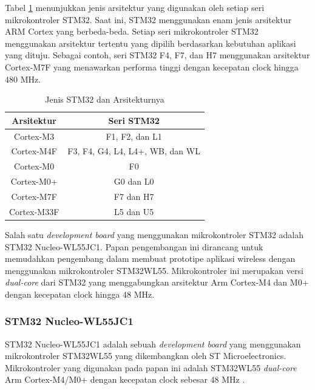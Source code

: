 Tabel \ref{Tab: stm-arch-table} menunjukkan jenis arsitektur yang digunakan oleh setiap seri mikrokontroler STM32. Saat ini, STM32 menggunakan enam jenis arsitektur ARM Cortex yang berbeda-beda. Setiap seri mikrokontroler STM32 menggunakan arsitektur tertentu yang dipilih berdasarkan kebutuhan aplikasi yang dituju. Sebagai contoh, seri STM32 F4, F7, dan H7 menggunakan arsitektur Cortex-M7F yang menawarkan performa tinggi dengan kecepatan clock hingga 480 MHz.

\begin{table}[H]
	\caption{Jenis STM32 dan Arsitekturnya}
	\vspace{0.5em}
	\centering
	\begin{tabular}{cc}
		\hline
		\textbf{Arsitektur} & \textbf{Seri STM32} \\
		\hline 
		Cortex-M3 & F1, F2, dan L1\\
		Cortex-M4F & F3, F4, G4, L4, L4+, WB, dan WL\\
		Cortex-M0 & F0\\ 
		Cortex-M0+ & G0 dan L0\\
		Cortex-M7F & F7 dan H7\\ 
		Cortex-M33F & L5 dan U5\\ \hline
	\end{tabular}
	\label{Tab: stm-arch-table}
\end{table}

Salah satu \textit{development board} yang menggunakan mikrokontroler STM32 adalah STM32 Nucleo-WL55JC1. Papan pengembangan ini dirancang untuk memudahkan pengembang dalam membuat prototipe aplikasi wireless dengan menggunakan mikrokontroler STM32WL55. Mikrokontroler ini merupakan versi \textit{dual-core} dari STM32 yang menggabungkan arsitektur Arm Cortex-M4 dan M0+ dengan kecepatan clock hingga 48 MHz.

\subsubsection{STM32 Nucleo-WL55JC1}
STM32 Nucleo-WL55JC1 adalah sebuah \textit{development board} yang menggunakan mikrokontroler STM32WL55 yang dikembangkan oleh ST Microelectronics. Mikrokontroler yang digunakan pada papan ini adalah STM32WL55 \textit{dual-core} Arm Cortex-M4/M0+ dengan kecepatan clock sebesar 48 MHz \cite{STMicroelectronics2022a}.

